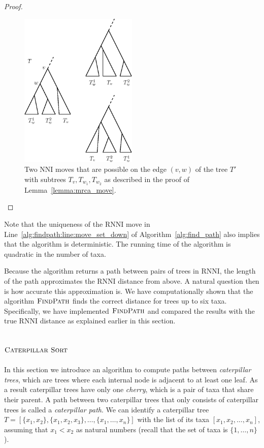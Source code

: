 \documentclass{amsart}
\newcommand{\nni}{\mathrm{NNI}}
\newcommand{\rnni}{\mathrm{RNNI}}
\newcommand{\csort}{\textsc{Caterpillar Sort}}
\newcommand{\findpath}{\textsc{FindPath}}
\begin{document}
\begin{proof}
\begin{figure}[H]
\centering
\includegraphics[width=0.5\textwidth]{mrca_move}
\vspace{12pt}
\caption{Two $\nni$ moves that are possible on the edge $(v,w)$ of the tree $T'$ with subtrees $T_v, T_{w_1}, T_{w_2}$ as described in the proof of Lemma~\ref{lemma:mrca_move}.}
\label{fig:mrca_move}
\end{figure}
\end{proof}

Note that the uniqueness of the $\rnni$ move in Line~\ref{alg:findpath:line:move_set_down} of Algorithm~\ref{alg:find_path} also implies that the algorithm is deterministic.
The running time of the algorithm is quadratic in the number of taxa.

Because the algorithm returns a path between pairs of trees in $\rnni$, the length of the path approximates the $\rnni$ distance from above.
A natural question then is how accurate this approximation is.
We have computationally shown that the algorithm $\findpath$ finds the correct distance for trees up to six taxa.
Specifically, we have implemented $\findpath$ \autocite{Collienne2019} and compared the results with the true $\rnni$ distance as explained earlier in this section.


\subsection{$\csort$}
\label{section:alg_csort}

In this section we introduce an algorithm to compute paths between \emph{caterpillar trees}, which are trees where each internal node is adjacent to at least one leaf.
As a result caterpillar trees have only one \emph{cherry}, which is a pair of taxa that share their parent.
A path between two caterpillar trees that only consists of caterpillar trees is called a \emph{caterpillar path}.
We can identify a caterpillar tree $T = [\{x_1, x_2\}, \{x_1, x_2, x_3\}, \ldots, \{x_1, \ldots, x_n\}]$ with the list of its taxa $[x_1, x_2, \ldots, x_n]$, assuming that $x_1 < x_2$ as natural numbers (recall that the set of taxa is $\{1, \ldots, n\}$).
\end{document}

